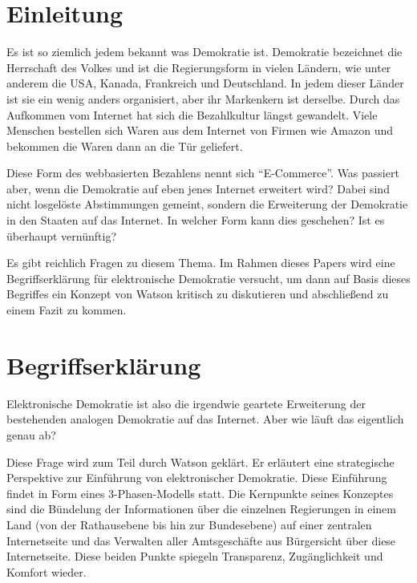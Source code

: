 \documentclass[12pt,twoside,ngerman]{scrartcl}
\theoremstyle{plain}
\theoremstyle{definition}
\theoremstyle{remark}
\begin{document}


\section{Einleitung}
\label{sec:introduction}

	Es ist so ziemlich jedem bekannt was Demokratie ist. Demokratie bezeichnet die Herrschaft des Volkes und ist die Regierungsform in vielen Ländern, wie unter anderem die USA, Kanada, Frankreich und Deutschland. In jedem dieser Länder ist sie ein wenig anders organisiert, aber ihr Markenkern ist derselbe. Durch das Aufkommen vom Internet hat sich die Bezahlkultur längst gewandelt. Viele Menschen bestellen sich Waren aus dem Internet von Firmen wie Amazon und bekommen die Waren dann an die Tür geliefert.
	
	Diese Form des webbasierten Bezahlens nennt sich "`E-Commerce"'. Was passiert aber, wenn die Demokratie auf eben jenes Internet erweitert wird? Dabei sind nicht losgelöste Abstimmungen gemeint, sondern die Erweiterung der Demokratie in den Staaten auf das Internet. In welcher Form kann dies geschehen? Ist es überhaupt vernünftig?
	
	Es gibt reichlich Fragen zu diesem Thema. Im Rahmen dieses Papers wird eine Begriffserklärung für elektronische Demokratie versucht, um dann auf Basis dieses Begriffes ein Konzept von Watson\cite{Watson2001} kritisch zu diskutieren und abschließend zu einem Fazit zu kommen.
	
\section{Begriffserklärung}
\label{sec:definition}

	Elektronische Demokratie ist also die irgendwie geartete Erweiterung der bestehenden analogen Demokratie auf das Internet. Aber wie läuft das eigentlich genau ab?
	
	Diese Frage wird zum Teil durch Watson\cite{Watson2001} geklärt. Er erläutert eine strategische Perspektive zur Einführung von elektronischer Demokratie. Diese Einführung findet in Form eines 3-Phasen-Modells statt. 
	Die Kernpunkte seines Konzeptes sind die Bündelung der Informationen über die einzelnen Regierungen in einem Land (von der Rathausebene bis hin zur Bundesebene) auf einer zentralen Internetseite und das Verwalten aller Amtsgeschäfte aus Bürgersicht über diese Internetseite. Diese beiden Punkte spiegeln Transparenz, Zugänglichkeit und Komfort wieder.
	
\end{document}
